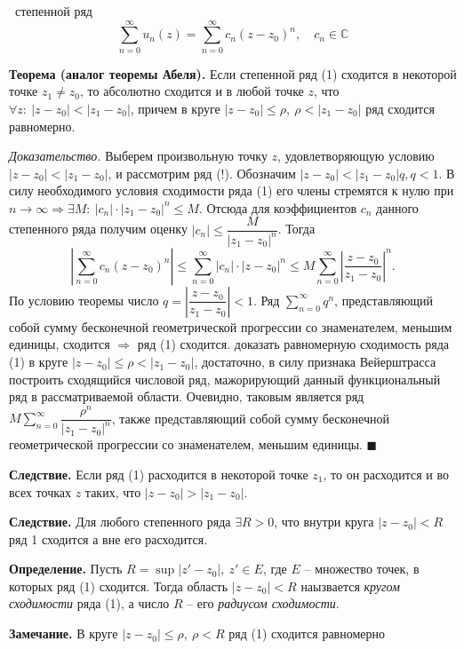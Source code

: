 \documentclass[9pt]{article}
\begin{document}
\ 
 степенной ряд
\begin{equation}
    \sum_{n=0}^\infty u_n(z)=\sum_{n=0}^\infty c_n(z-z_0)^n,\quad c_n\in\mathbb C
\end{equation}
\par\textbf{Теорема (аналог теоремы Абеля).} Если степенной ряд (1) сходится в некоторой точке \(z_1\neq z_0\), то абсолютно сходится и в любой точке \(z\), что \(\forall z:\ |z-z_0|<|z_1-z_0|\), причем в круге \(|z-z_0|\le\rho,\ \rho<|z_1-z_0|\) ряд сходится равномерно.
\par\textit{Доказательство.} Выберем произвольную точку \(z\), удовлетворяющую условию \(|z-z_0|<|z_1-z_0|\), и рассмотрим ряд (!). Обозначим \(|z-z_0|<|z_1-z_0|q,q<1\). В силу необходимого условия сходимости ряда (1) его члены стремятся к нулю при \(n\to\infty\Rightarrow\exists M:\ |c_n|\cdot|z_1-z_0|^n\le M\). Отсюда для коэффициентов \(c_n\) данного степенного ряда получим оценку \(|c_n|\le\dfrac{M}{|z_1-z_0|^n}\). Тогда \[\displaystyle|\sum_{n=0}^\infty c_n(z-z_0)^n|\le\sum_{n=0}^\infty |c_n|\cdot|z-z_0|^n\le M\sum_{n=0}^\infty\left|\frac{z-z_0}{z_1-z_0}\right|^n.\]
По условию теоремы число \(q=\left|\dfrac{z-z_0}{z_1-z_0}\right|<1\). Ряд \(\displaystyle\sum_{n=0}^\infty q^n\), представляющий собой сумму бесконечной геометрической прогрессии со знаменателем, меньшим единицы, сходится \(\Rightarrow\) ряд (1) сходится.
\parЧтобы доказать равномерную сходимость ряда (1) в круге \(|z-z_0|\le\rho<|z_1-z_0|\), достаточно, в силу признака Вейерштрасса построить сходящийся числовой ряд, мажорирующий данный функциональный ряд в рассматриваемой области. Очевидно, таковым является ряд \(M\displaystyle\sum_{n=0}^\infty\dfrac{\rho^n}{|z_1-z_0|^n}\), также представляющий собой сумму бесконечной геометрической прогрессии со знаменателем, меньшим единицы. \(\blacksquare\)
\par\textbf{Следствие.} Если ряд (1) расходится в некоторой точке \(z_1\), то он расходится и во всех точках \(z\) таких, что \(|z-z_0|>|z_1-z_0|\). \par\textbf{Следствие.} Для любого степенного ряда \(\exists R>0\), что внутри круга \(|z-z_0|<R\) ряд 1 сходится а вне его расходится.
\par\textbf{Определение.} Пусть \(R=\sup|z'-z_0|,\ z'\in E\), где \(E\) -- множество точек, в которых ряд (1) сходится. Тогда область \(|z-z_0|<R\) наызвается \textit{кругом сходимости} ряда (1), а число \(R\) -- его \textit{радиусом сходимости}.
\par\textbf{Замечание.} В круге \(|z-z_0|\le\rho,\ \rho<R\) ряд (1) сходится равномерно
\end{document}
